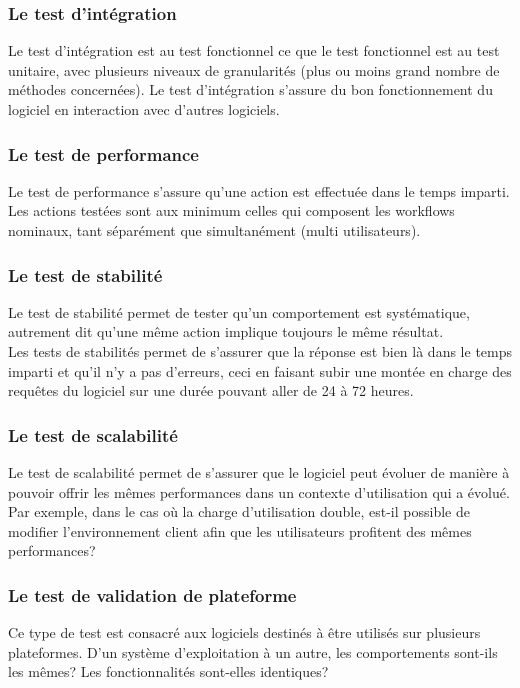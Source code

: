 \subsubsection{Le test d'int\'{e}gration}
Le test d'int\'{e}gration est au test fonctionnel ce que le test fonctionnel est au test unitaire, avec plusieurs niveaux de granularit\'{e}s (plus ou moins grand nombre de m\'{e}thodes concern\'{e}es). Le test d'int\'{e}gration s'assure du bon fonctionnement du logiciel en interaction avec d'autres logiciels.

\subsubsection{Le test de performance}
Le test de performance s'assure qu'une action est effectu\'{e}e dans le temps imparti. Les actions test\'{e}es sont aux minimum celles qui composent les workflows nominaux, tant s\'{e}par\'{e}ment que simultan\'{e}ment (multi utilisateurs).

\subsubsection{Le test de stabilit\'{e}}
Le test de stabilit\'{e} permet de tester qu'un comportement est syst\'{e}matique, autrement dit qu'une m\^{e}me action implique toujours le m\^{e}me r\'{e}sultat.\\
Les tests de stabilit\'{e}s permet de s'assurer que la r\'{e}ponse est bien l\`{a} dans le temps imparti et qu'il n'y a pas d'erreurs, ceci en faisant subir une mont\'{e}e en charge des requ\^{e}tes du logiciel sur une dur\'{e}e pouvant aller de 24 \`{a} 72 heures.

\subsubsection{Le test de scalabilit\'{e}}
Le test de scalabilit\'{e} permet de s'assurer que le logiciel peut \'{e}voluer de mani\`{e}re \`{a} pouvoir offrir les m\^{e}mes performances dans un contexte d'utilisation qui a \'{e}volu\'{e}. Par exemple, dans le cas o\`{u} la charge d'utilisation double, est-il possible de modifier l'environnement client afin que les utilisateurs profitent des m\^{e}mes performances?


\subsubsection{Le test de validation de plateforme}
Ce type de test est consacr\'{e} aux logiciels destin\'{e}s \`{a} \^{e}tre utilis\'{e}s sur plusieurs plateformes. D'un syst\`{e}me d'exploitation \`{a} un autre, les comportements sont-ils les m\^{e}mes? Les fonctionnalit\'{e}s sont-elles identiques?

